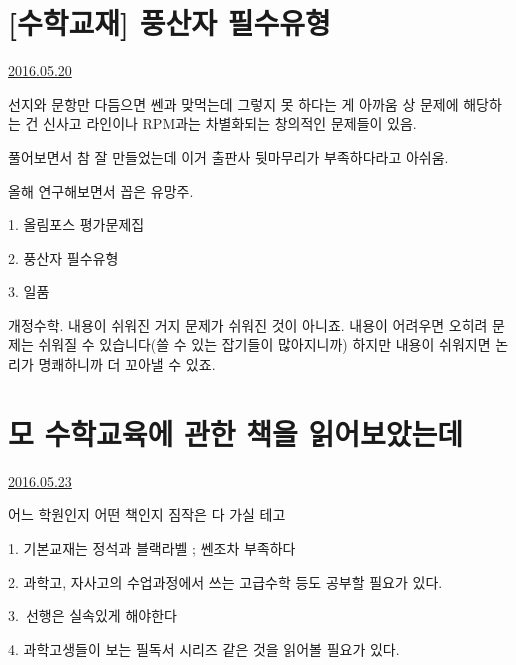 \section{[수학교재] 풍산자 필수유형}
\href{https://www.kockoc.com/Apoc/784630}{2016.05.20}

\vspace{5mm}

선지와 문항만 다듬으면 쎈과 맞먹는데 그렇지 못 하다는 게 아까움
상 문제에 해당하는 건 신사고 라인이나 RPM과는 차별화되는 창의적인 문제들이 있음.
\vspace{5mm}

풀어보면서 참 잘 만들었는데 이거 출판사 뒷마무리가 부족하다라고 아쉬움.
\vspace{5mm}

올해 연구해보면서 꼽은 유망주.
\vspace{5mm}

\item 1. 올림포스 평가문제집
\item 2. 풍산자 필수유형
\item 3. 일품
\vspace{5mm}

개정수학.
내용이 쉬워진 거지 문제가 쉬워진 것이 아니죠. 내용이 어려우면 오히려 문제는 쉬워질 수 있습니다(쓸 수 있는 잡기들이 많아지니까)
하지만 내용이 쉬워지면 논리가 명쾌하니까 더 꼬아낼 수 있죠.
\vspace{5mm}







\section{모 수학교육에 관한 책을 읽어보았는데}
\href{https://www.kockoc.com/Apoc/788825}{2016.05.23}

\vspace{5mm}

어느 학원인지 어떤 책인지 짐작은 다 가실 테고
\vspace{5mm}

\item 1. 기본교재는 정석과 블랙라벨 ; 쎈조차 부족하다
\item 2. 과학고, 자사고의 수업과정에서 쓰는 고급수학 등도 공부할 필요가 있다.
\item 3. 선행은 실속있게 해야한다
\item 4. 과학고생들이 보는 필독서 시리즈 같은 것을 읽어볼 필요가 있다.
\vspace{5mm}

